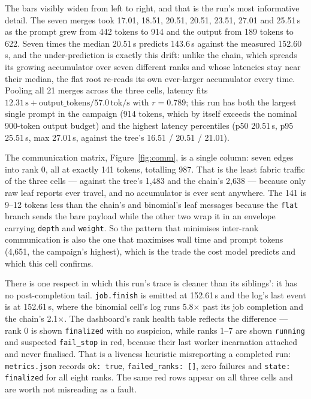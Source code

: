 \documentclass[11pt]{article}
\begin{document}
The bars visibly widen from left to right, and that is the run's most informative
detail. The seven merges took 17.01, 18.51, 20.51, 20.51, 23.51, 27.01 and 25.51\,s as
the prompt grew from 442 tokens to 914 and the output from 189 tokens to 622. Seven times
the median 20.51\,s predicts 143.6\,s against the measured 152.60\,s, and the
under-prediction is exactly this drift: unlike the chain, which spreads its growing
accumulator over seven different ranks and whose latencies stay near their median, the
flat root re-reads its own ever-larger accumulator every time. Pooling all 21 merges
across the three cells, latency fits
$12.31\,\text{s} + \text{output\_tokens} / 57.0\,\text{tok/s}$ with $r = 0.789$; this
run has both the largest single prompt in the campaign (914 tokens, which by itself
exceeds the nominal 900-token output budget) and the highest latency percentiles
(p50 20.51\,s, p95 25.51\,s, max 27.01\,s, against the tree's 16.51 / 20.51 / 21.01).

The communication matrix, Figure~\ref{fig:comm}, is a single column: seven edges into
rank 0, all at exactly 141 tokens, totalling 987. That is the least fabric traffic of
the three cells --- against the tree's 1{,}483 and the chain's 2{,}638 --- because only
raw leaf reports ever travel, and no accumulator is ever sent anywhere. The 141 is 9--12
tokens less than the chain's and binomial's leaf messages because the \texttt{flat}
branch sends the bare payload while the other two wrap it in an envelope carrying
\texttt{depth} and \texttt{weight}. So the pattern that minimises inter-rank
communication is also the one that maximises wall time and prompt tokens (4{,}651, the
campaign's highest), which is the trade the cost model predicts and which this cell
confirms.

There is one respect in which this run's trace is cleaner than its siblings': it has no
post-completion tail. \texttt{job.finish} is emitted at 152.61\,s and the log's last
event is at 152.61\,s, where the binomial cell's log runs 5.8$\times$ past its job
completion and the chain's 2.1$\times$. The dashboard's rank health table reflects the
difference --- rank 0 is shown \texttt{finalized} with no suspicion, while ranks 1--7
are shown \texttt{running} and suspected \texttt{fail\_stop} in red, because their last
worker incarnation attached and never finalised. That is a liveness heuristic
misreporting a completed run: \texttt{metrics.json} records \texttt{ok: true},
\texttt{failed\_ranks: []}, zero failures and \texttt{state: finalized} for all eight
ranks. The same red rows appear on all three cells and are worth not misreading as a
fault.
\end{document}
